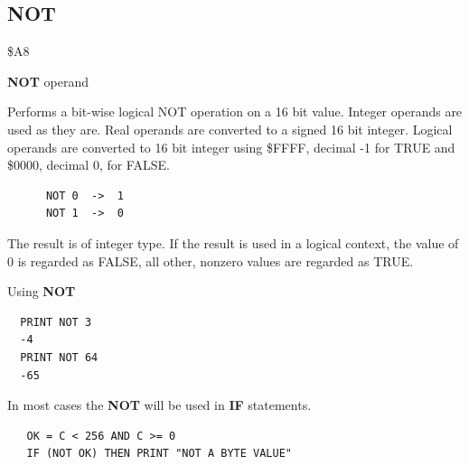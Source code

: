 
\newpage
\subsection{NOT}
\begin{description}[leftmargin=2cm,style=nextline]
\item [Token:] \$A8
\item [Format:] {\bf NOT} operand
\item [Usage:]  Performs a bit-wise
                logical NOT operation on a 16 bit value.
                Integer operands are used as they are.
                Real operands are converted to a signed 16 bit integer.
                Logical operands are converted to 16 bit integer
                using \$FFFF, decimal -1 for TRUE
                and \$0000, decimal 0, for FALSE.

   \begin{verbatim}
      NOT 0  ->  1
      NOT 1  ->  0
   \end{verbatim}

\item [Remarks:] The result is of integer type.
                 If the result is used in a logical context,
                 the value of 0 is regarded as FALSE,
                 all other, nonzero values are regarded as TRUE.
\item [Example:] Using {\bf NOT}

\begin{tcolorbox}[colback=black,coltext=white]
\verbatimfont{\codefont}
\begin{verbatim}
  PRINT NOT 3
  -4
  PRINT NOT 64
  -65
\end{verbatim}
\end{tcolorbox}

In most cases the {\bf NOT} will be used in {\bf IF} statements.

\begin{tcolorbox}[colback=black,coltext=white]
\verbatimfont{\codefont}
\begin{verbatim}
   OK = C < 256 AND C >= 0
   IF (NOT OK) THEN PRINT "NOT A BYTE VALUE"
\end{verbatim}
\end{tcolorbox}
\end{description}


\newpage
